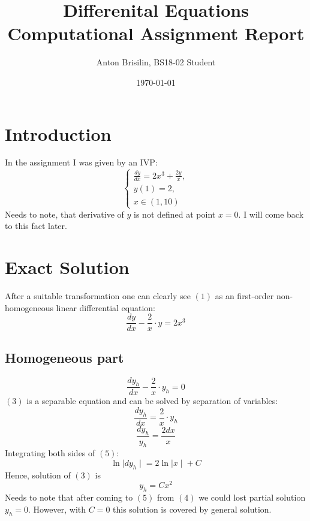 \documentclass[a4paper,12pt]{article}
\title{Differenital Equations Computational Assignment Report}
\author{Anton Brisilin, BS18-02 Student}
\date{\today}
\begin{document}
\maketitle

\section{Introduction}
In the assignment I was given by an IVP:
\begin{equation}
    \begin{cases}
        \frac{dy}{dx} = 2x^3 + \frac{2y}{x},\\
        y(1)=2,\\
        x \in (1, 10)
    \end{cases}
\end{equation}
Needs to note, that derivative of $y$ is not defined at point
$x=0$. I will come back to this fact later.

\section{Exact Solution}
After a suitable transformation one can clearly see $(1)$ as an
first-order non-homogeneous linear differential equation:
\begin{equation}
    \frac{dy}{dx} - \frac{2}{x} \cdot y = 2x^3
\end{equation}

\subsection{Homogeneous part}
\begin{equation}
    \frac{dy_h}{dx} - \frac{2}{x} \cdot y_h = 0
\end{equation}
$(3)$ is a separable equation and can be solved by separation of
variables:
\begin{equation}
    \frac{dy_h}{dx} = \frac{2}{x} \cdot y_h
\end{equation} 
\begin{equation}
    \frac{dy_h}{y_h} = \frac{2dx}{x}
\end{equation}
Integrating both sides of $(5)$:
\begin{equation}
    \ln{\mid dy_h \mid} = 2 \ln{\mid x \mid} + C
\end{equation}
Hence, solution of $(3)$ is 
\begin{equation}
    y_h = Cx^2
\end{equation}
Needs to note that after coming to $(5)$ from $(4)$ we could lost
partial solution $y_h = 0$. However, with $C=0$ this solution is 
covered by general solution. 
\end{document}
